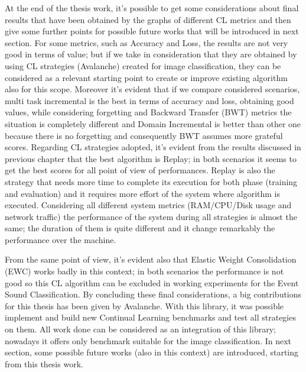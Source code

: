 \documentclass[english, LaM, oneside]{sapthesis}%
\begin{document}
At the end of the thesis work, it's possible to get some considerations about final results that have been obtained by the graphs of different CL metrics and then give some further points for possible future works that will be introduced in next section.
\newline \newline
For some metrics, such as Accuracy and Loss, the results are not very good in terms of value; but if we take in consideration that they are obtained by using CL strategies (Avalanche) created for image classification, they can be considered as a relevant starting point to create or improve existing algorithm also for this scope.
Moreover it's evident that if we compare considered scenarios, multi task incremental is the best in terms of accuracy and loss, obtaining good values, while considering forgetting and Backward Transfer (BWT) metrics the situation is completely different and  Domain Incremental is better than other one because there is no forgetting and consequently BWT assumes more grateful scores.
\newline \newline
Regarding CL strategies adopted, it's evident from the results discussed in previous chapter that the best algorithm is Replay; in both scenarios it seems to get the best scores for all point of view of performances. 
Replay is also the strategy that needs more time to complete its execution for both phase (training and evaluation) and it requires more effort of the system where algorithm is executed. Considering all different system metrics (RAM/CPU/Disk usage and network traffic) the performance of the system during all strategies is almost the same; the duration of them is quite different and it change remarkably the performance over the machine.

From the same point of view, it's evident also that Elastic Weight Consolidation (EWC) works badly in this context; in both scenarios the performance is not good so this CL algorithm  can be excluded in working experiments for the Event Sound Classification.
\newline \newline
By concluding these final considerations, a big contributions for this thesis has been given by Avalanche. With this library, it was possible implement and build new Continual Learning benchmarks and test all strategies on them. All work done can be considered as an integration of this library; nowadays it offers only benchmark suitable for the image classification. In next section, some possible future works (also in this context) are introduced, starting from this thesis work.
\end{document}
